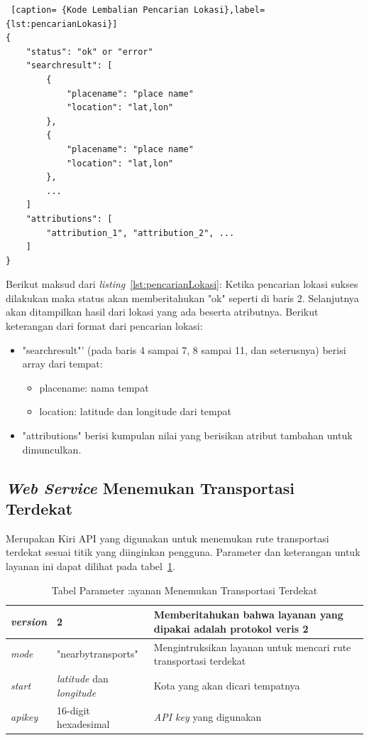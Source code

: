 \begin{lstlisting} [caption= {Kode Lembalian Pencarian Lokasi},label={lst:pencarianLokasi}]
{
    "status": "ok" or "error"
    "searchresult": [
        {
            "placename": "place name"
            "location": "lat,lon"
        },
        {
            "placename": "place name"
            "location": "lat,lon"
        },
        ...
    ]
    "attributions": [
        "attribution_1", "attribution_2", ...
    ]
}
\end{lstlisting}
Berikut maksud dari \textit{listing}~\ref{lst:pencarianLokasi}: 
\newline
\hspace{0.5cm} Ketika pencarian lokasi sukses dilakukan maka status akan memberitahukan "ok" seperti di baris 2. Selanjutnya akan ditampilkan hasil dari lokasi yang ada beserta atributnya. Berikut keterangan dari format dari pencarian lokasi:
\begin{itemize}
	\item "searchresult"' (pada baris 4 sampai 7, 8 sampai 11, dan seterusnya) berisi array dari tempat:
	\begin{itemize}
		\item placename: nama tempat
		\item location: latitude dan longitude dari tempat
	\end{itemize}
	\item "attributions" berisi kumpulan nilai yang berisikan atribut tambahan untuk dimunculkan.
\end{itemize}	

\subsection{\textit{Web Service} Menemukan Transportasi Terdekat}
\label{subsec:Service Menemukan Transportasi Terdekat}
\hspace{0.5cm} Merupakan Kiri API yang digunakan untuk menemukan rute transportasi terdekat sesuai titik yang diinginkan pengguna. Parameter dan keterangan untuk layanan ini dapat dilihat pada tabel~\ref{tab:transportasiTerdekat}.

\begin{table}[H]
	\centering
		\begin{tabular}{ |p{2cm}|p{4cm}|p{8cm}| }
			\hline
			\textit{version} & 2 &  Memberitahukan bahwa layanan yang dipakai adalah protokol veris 2 \\ \hline
			\textit{mode} & "nearbytransports" & Mengintruksikan layanan untuk mencari rute transportasi terdekat \\ \hline
			\textit{start} & \textit{latitude} dan \textit{longitude} & Kota yang akan dicari tempatnya \\ \hline
			\textit{apikey} & 16-digit hexadesimal & \textit{API key} yang digunakan \\ \hline
			\hline
		\end{tabular}
	\caption{Tabel Parameter :ayanan Menemukan Transportasi Terdekat}
	\label{tab:transportasiTerdekat}
\end{table}


